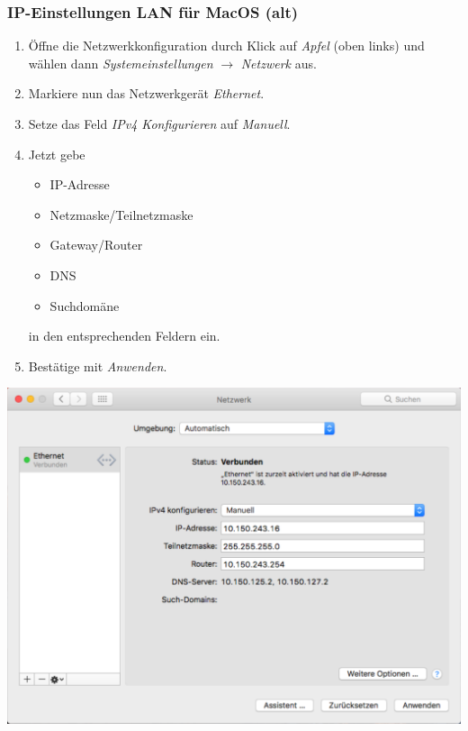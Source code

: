 \documentclass[a4paper,12pt]{scrartcl}
\begin{document}
\subsubsection*{IP-Einstellungen LAN für MacOS (alt)}

\begin{minipage}{0.57\textwidth}
\begin{enumerate}
    \item Öffne die Netzwerkkonfiguration durch Klick auf \textit{Apfel} (oben links) und wählen dann \textit{Systemeinstellungen} $\rightarrow$ \textit{Netzwerk} aus.
    \item Markiere nun das Netzwerkgerät \textit{Ethernet}.
    \item Setze das Feld \textit{IPv4 Konfigurieren} auf \textit{Manuell}.
    \item Jetzt gebe
    \begin{itemize}
    	\item IP-Adresse
    	\item Netzmaske/Teilnetzmaske
    	\item Gateway/Router
    	\item DNS
    	\item Suchdomäne
    \end{itemize}
	in den entsprechenden Feldern ein.
	\item Bestätige mit \textit{Anwenden}.
\end{enumerate}
\end{minipage}
\hfill
\begin{minipage}{0.4\textwidth}
	\centering
	\includegraphics[width=\linewidth,keepaspectratio]{Bilder/IP_MAC}
\end{minipage}
\end{document}
